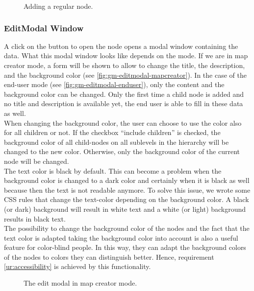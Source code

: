 \begin{figure}[H]
	\centering
	\caption{Adding a regular node.}
	\label{fig:gm-add-regular}
\end{figure}



\subsubsection{EditModal Window}\label{sec:editmodal}
A click on the button to open the node opens a modal window containing the data. What this modal window looks like depends on the mode. If we are in map creator mode, a form will be shown to allow to change the title, the description, and the background color (see \autoref{fig:gm-editmodal-mapcreator}). In the case of the end-user mode (see \autoref{fig:gm-editmodal-enduser}), only the content and the background color can be changed. Only the first time a child node is added and no title and description is available yet, the end user is able to fill in these data as well.\\

When changing the background color, the user can choose to use the color also for all children or not. If the checkbox ``include children'' is checked, the background color of all child-nodes on all sublevels in the hierarchy will be changed to the new color. Otherwise, only the background color of the current node will be changed.\\

The text color is black by default. This can become a problem when the background color is changed to a dark color and certainly when it is black as well because then the text is not readable anymore. To solve this issue, we wrote some CSS rules that change the text-color depending on the background color. A black (or dark) background will result in white text and a white (or light) background results in black text.\\

The possibility to change the background color of the nodes and the fact that the text color is adapted taking the background color into account is also a useful feature for color-blind people. In this way, they can adapt the background colors of the nodes to colors they can distinguish better. Hence, requirement \ref{ur:accessibility} is achieved by this functionality.

\begin{figure}[H]
	\centering
	\caption{The edit modal in map creator mode.}
	\label{fig:gm-editmodal-mapcreator}
\end{figure}

